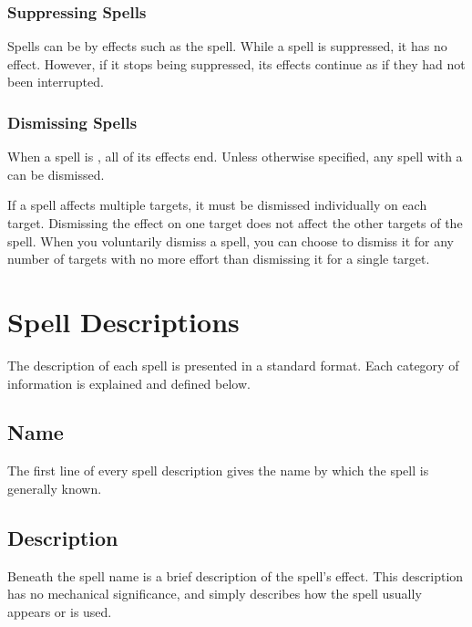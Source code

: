         \subsubsection{Suppressing Spells}\label{Suppressing Spells}
            Spells can be  by effects such as the  spell.
            While a spell is suppressed, it has no effect.
            However, if it stops being suppressed, its effects continue as if they had not been interrupted.

        \subsubsection{Dismissing Spells}\label{Dismissing Spells}
            When a spell is , all of its effects end.
            Unless otherwise specified, any spell with a  can be dismissed.

            If a spell affects multiple targets, it must be dismissed individually on each target.
            Dismissing the effect on one target does not affect the other targets of the spell.
            When you voluntarily dismiss a spell, you can choose to dismiss it for any number of targets with no more effort than dismissing it for a single target.

\section{Spell Descriptions}
    The description of each spell is presented in a standard format.
    Each category of information is explained and defined below.

    \subsection{Name}
        The first line of every spell description gives the name by which the spell is generally known.

    \subsection{Description}
        Beneath the spell name is a brief description of the spell's effect.
        This description has no mechanical significance, and simply describes how the spell usually appears or is used.

